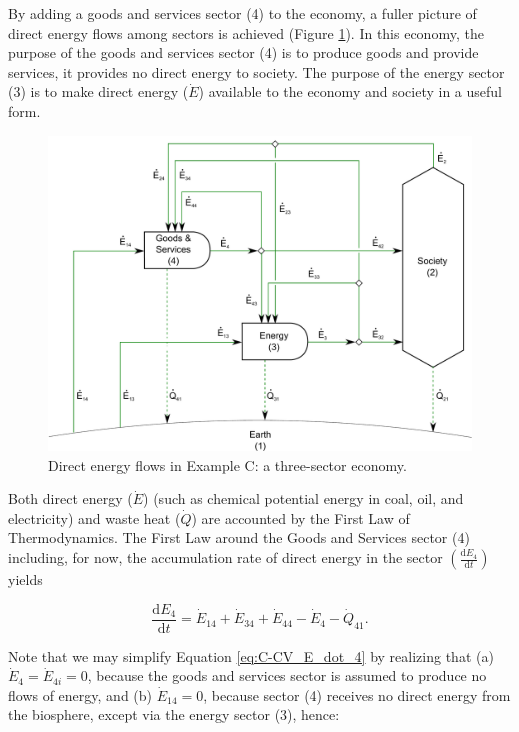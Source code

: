 By adding a goods and services sector (4) to the economy, 
a fuller picture of direct energy flows among sectors is achieved
(Figure \ref{fig:C_energy}). 
In this economy, the purpose of the goods and services sector (4) 
is to produce goods and provide services, 
it provides no direct energy to society. 
The purpose of the energy sector (3) is to make direct energy ($\dot{E}$) 
available to the economy and society in a useful form.

\begin{figure}[h!]
\centering
\includegraphics[width=0.8\linewidth]{Part_2/Chapter_Energy/images/3_sector_direct_energy.pdf}
\caption{Direct energy flows in Example C: a three-sector economy.}
\label{fig:C_energy}
\end{figure}

Both direct energy ($\dot{E}$) (such as chemical potential energy in coal, 
oil, and electricity) and waste heat ($\dot{Q}$) 
are accounted by the First Law of Thermodynamics. 
The First Law around the Goods and Services sector (4) including, 
for now, the accumulation rate of direct energy in the sector 
$\left(\frac{\mathrm{d}E_{4}}{\mathrm{d}t}\right)$ yields

\begin{equation} \label{eq:C-CV_E_dot_4}
	\frac{\mathrm{d}E_{4}}{\mathrm{d}t} 	 
	= \dot{E}_{14} + \dot{E}_{34} + \dot{E}_{44} - \dot{E}_4 - \dot{Q}_{41}.
\end{equation}

Note that we may simplify Equation \ref{eq:C-CV_E_dot_4} 
by realizing that (a) $\dot{E}_{4} = \dot{E}_{4i} = 0$, 
because the goods and services sector 
is assumed to produce no flows of energy, 
and (b) $\dot{E}_{14} = 0$, 
because sector (4) receives no direct energy from the biosphere, 
except via the energy sector (3), hence:

